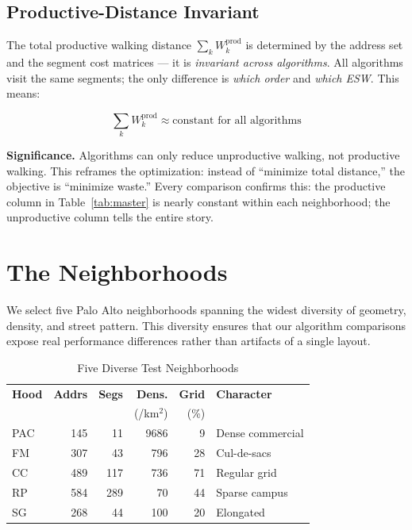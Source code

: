 \documentclass[conference]{IEEEtran}
\begin{document}
\subsection{Productive-Distance Invariant}

The total productive walking distance $\sum_k W_k^{\text{prod}}$ is determined by the address set and the segment cost matrices --- it is \emph{invariant across algorithms}. All algorithms visit the same segments; the only difference is \emph{which order} and \emph{which ESW}. This means:

\begin{equation}
\sum_k W_k^{\text{prod}} \approx \text{constant for all algorithms}
\label{eq:invariant}
\end{equation}

\textbf{Significance.} Algorithms can only reduce unproductive walking, not productive walking. This reframes the optimization: instead of ``minimize total distance,'' the objective is ``minimize waste.'' Every comparison confirms this: the productive column in Table~\ref{tab:master} is nearly constant within each neighborhood; the unproductive column tells the entire story.

\section{The Neighborhoods}
\label{sec:neighborhoods}

We select five Palo Alto neighborhoods spanning the widest diversity of geometry, density, and street pattern. This diversity ensures that our algorithm comparisons expose real performance differences rather than artifacts of a single layout.

\begin{table}[htbp]
\caption{Five Diverse Test Neighborhoods}
\label{tab:hoods}
\begin{center}
\begin{tabular}{l r r r r l}
\toprule
\textbf{Hood} & \textbf{Addrs} & \textbf{Segs} & \textbf{Dens.} & \textbf{Grid} & \textbf{Character} \\
       &        &        & (/km$^2$)   & (\%)     & \\
\midrule
PAC & 145 & 11 & 9686 & 9 & Dense commercial \\
FM & 307 & 43 & 796 & 28 & Cul-de-sacs \\
CC & 489 & 117 & 736 & 71 & Regular grid \\
RP & 584 & 289 & 70 & 44 & Sparse campus \\
SG & 268 & 44 & 100 & 20 & Elongated \\
\bottomrule
\end{tabular}
\end{center}
\end{table}
\end{document}
